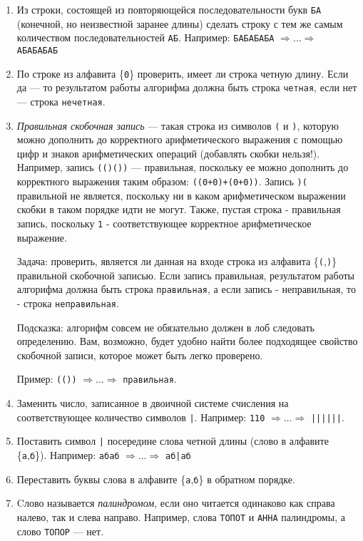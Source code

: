 \documentclass[12pt,a4paper,oneside]{article}
\newcommand{\s}[1]{\texttt{#1}}
\begin{document}
\begin{enumerate}
\item Из строки, состоящей из повторяющейся последовательности букв \s{БА}
(конечной, но неизвестной заранее длины) сделать строку с тем же самым
количеством последовательностей \s{АБ}.
Например: \s{БАБАБАБА} $\Rightarrow\dots\Rightarrow$ \s{АБАБАБАБ}

\item По строке из алфавита \{\s{0}\} проверить, имеет ли строка четную длину.
Если да --- то результатом работы алгорифма должна быть строка \s{четная}, если
нет --- строка \s{нечетная}.

\item \emph{Правильная скобочная запись} --- такая строка из 
символов \s{(} и \s{)}, которую можно дополнить до корректного 
арифметического выражения с помощью цифр и знаков арифметических операций 
(добавлять скобки нельзя!). 
Например, запись \s{(()())} --- правильная, поскольку 
ее можно дополнить до корректного выражения таким образом: 
\s{((0+0)+(0+0))}. Запись \s{)(} правильной не является, поскольку 
ни в каком арифметическом выражении скобки в таком порядке идти не могут. 
Также, пустая строка - правильная запись, поскольку \s{1} - соответствующее 
корректное арифметическое выражение. 

Задача: проверить, является ли данная на входе строка из алфавита \{\s{(},\s{)}\}
правильной скобочной записью. Если запись правильная, результатом работы 
алгорифма должна быть строка \s{правильная}, а если запись - неправильная, 
то - строка \s{неправильная}.

Подсказка: алгорифм совсем не обязательно должен в лоб следовать 
определению. Вам, возможно, будет удобно найти более подходящее свойство скобочной 
записи, которое может быть легко проверено.

Пример: \s{(())} $\Rightarrow\dots\Rightarrow$ \s{правильная}.

\item Заменить число, записанное в двоичной системе счисления на 
соответствующее количество символов \s{|}. Например: 
\s{110} $\Rightarrow\dots\Rightarrow$ \s{||||||}.

\item Поставить символ \s{|} посередине слова четной длины (слово в алфавите
\{\s{а},\s{б}\}). 
Например: \s{абаб} $\Rightarrow\dots\Rightarrow$ \s{аб|аб}

\item Переставить буквы слова в алфавите \{\s{а},\s{б}\} в обратном порядке.

\item Cлово называется \emph{палиндромом}, если оно читается одинаково
как справа налево, так и слева направо. Например, слова \s{ТОПОТ} и 
\s{АННА} палиндромы, а слово \s{ТОПОР} --- нет. 


\end{enumerate}
\end{document}
